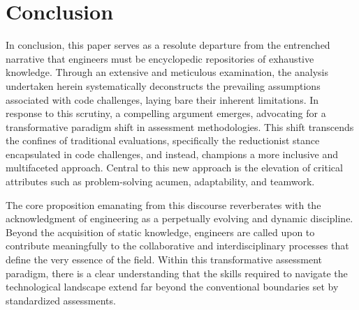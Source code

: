 \documentclass[
    a4paper, %
    10pt, %
    unnumberedsections, %
    twoside, %
]{LTJournalArticle}
\begin{document}
\begin{comment}
Lorem ipsum dolor sit amet, consectetur adipiscing elit. Sed do eiusmod tempor incididunt ut labore et dolore magna aliqua. Ut enim ad minim veniam, quis nostrud exercitation ullamco laboris nisi ut aliquip ex ea commodo consequat. Duis aute irure dolor in reprehenderit in voluptate velit esse cillum dolore eu fugiat nulla pariatur. Excepteur sint occaecat cupidatat non proident, sunt in culpa qui officia deserunt mollit anim id est laborum. \cite{Smith2020,Johnson2019,Brown2021,Garcia2022}.


\end{comment}







\section{Conclusion}

In conclusion, this paper serves as a resolute departure from the entrenched narrative that engineers must be encyclopedic repositories of exhaustive knowledge. Through an extensive and meticulous examination, the analysis undertaken herein systematically deconstructs the prevailing assumptions associated with code challenges, laying bare their inherent limitations. In response to this scrutiny, a compelling argument emerges, advocating for a transformative paradigm shift in assessment methodologies. This shift transcends the confines of traditional evaluations, specifically the reductionist stance encapsulated in code challenges, and instead, champions a more inclusive and multifaceted approach. Central to this new approach is the elevation of critical attributes such as problem-solving acumen, adaptability, and teamwork.

The core proposition emanating from this discourse reverberates with the acknowledgment of engineering as a perpetually evolving and dynamic discipline. Beyond the acquisition of static knowledge, engineers are called upon to contribute meaningfully to the collaborative and interdisciplinary processes that define the very essence of the field. Within this transformative assessment paradigm, there is a clear understanding that the skills required to navigate the technological landscape extend far beyond the conventional boundaries set by standardized assessments.
\end{document}
